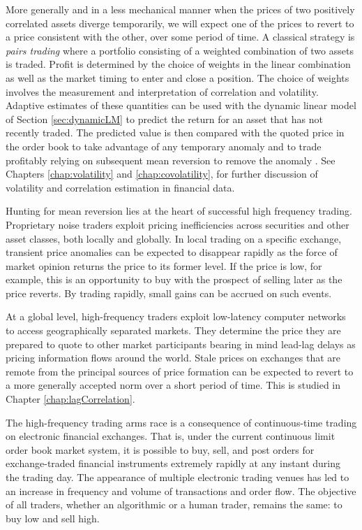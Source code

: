 More generally and in a less mechanical manner when the prices of two positively correlated assets diverge temporarily, we will expect one of the prices to revert to a price consistent with the other, over some period of time. A classical strategy is \emph{pairs trading} where a portfolio consisting of a weighted combination of two assets is traded. Profit is determined by the choice of weights in the linear combination as well as the market timing to enter and close a position. The choice of weights involves the measurement and interpretation of correlation and volatility. Adaptive estimates of these quantities can be used with the dynamic linear model of Section \ref{sec:dynamicLM} to predict the return for an asset that has not recently traded. The predicted value is then compared with the quoted price in the order book to take advantage of any temporary anomaly and to trade profitably relying on subsequent mean reversion to remove the anomaly . See Chapters \ref{chap:volatility} and \ref{chap:covolatility}, for further discussion of volatility and correlation estimation in financial data.    

Hunting for mean reversion lies at the heart of successful high frequency trading. Proprietary noise traders exploit pricing inefficiencies across securities and other asset classes, both locally and globally. In local trading on a specific exchange, transient price anomalies can be expected to disappear rapidly as the force of market opinion returns the price to its former level. If the price is low, for example, this is an opportunity to buy with the prospect of selling later as the price reverts. By trading rapidly, small gains can be accrued on such events. 

At a global level, high-frequency traders exploit low-latency computer networks to access geographically separated markets. They determine the price they are prepared to quote to other market participants bearing in mind lead-lag delays as pricing information flows around the world. Stale prices on exchanges that are remote from the principal sources of price formation can be expected to revert to a more generally accepted norm over a short period of time.  This is studied in Chapter \ref{chap:lagCorrelation}. 




The high-frequency trading arms race is a consequence of continuous-time trading on electronic financial exchanges. That is, under the current continuous limit order book market system, it is possible to buy, sell, and post orders for exchange-traded financial instruments extremely rapidly at any instant during the trading day. 
The appearance of multiple electronic trading venues has led to an increase in frequency and volume of transactions and order flow. The objective of all traders, whether an algorithmic or a human trader, remains the same: to buy low and sell high. 

